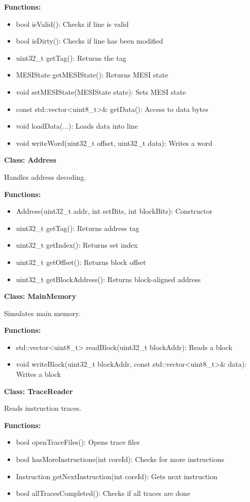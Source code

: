 \documentclass[12pt,a4paper]{article}
\begin{document}
\textbf{Functions:}
\begin{itemize}
    \item bool isValid(): Checks if line is valid
    \item bool isDirty(): Checks if line has been modified
    \item uint32\_t getTag(): Returns the tag
    \item MESIState getMESIState(): Returns MESI state
    \item void setMESIState(MESIState state): Sets MESI state
    \item const std::vector<uint8\_t>\& getData(): Access to data bytes
    \item void loadData(...): Loads data into line
    \item void writeWord(uint32\_t offset, uint32\_t data): Writes a word
\end{itemize}

\textbf{Class: Address}

Handles address decoding.

\textbf{Functions:}
\begin{itemize}
    \item Address(uint32\_t addr, int setBits, int blockBits): Constructor
    \item uint32\_t getTag(): Returns address tag
    \item uint32\_t getIndex(): Returns set index
    \item uint32\_t getOffset(): Returns block offset
    \item uint32\_t getBlockAddress(): Returns block-aligned address
\end{itemize}

\textbf{Class: MainMemory}

Simulates main memory.

\textbf{Functions:}
\begin{itemize}
    \item std::vector<uint8\_t> readBlock(uint32\_t blockAddr): Reads a block
    \item void writeBlock(uint32\_t blockAddr, const std::vector<uint8\_t>\& data): Writes a block
\end{itemize}

\textbf{Class: TraceReader}

Reads instruction traces.

\textbf{Functions:}
\begin{itemize}
    \item bool openTraceFiles(): Opens trace files
    \item bool hasMoreInstructions(int coreId): Checks for more instructions
    \item Instruction getNextInstruction(int coreId): Gets next instruction
    \item bool allTracesCompleted(): Checks if all traces are done
\end{itemize}
\end{document}
